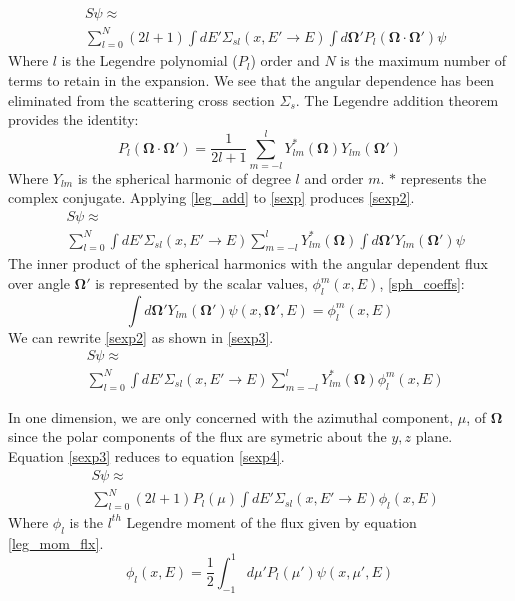 \begin{eqnarray}
& S\psi \approx \nonumber \\
& \sum_{l=0}^N (2l+1) \int dE' \Sigma_{sl}(x, E'\rightarrow E)
  \int d\mathbf\Omega' P_l(\mathbf\Omega \cdot \mathbf{\Omega'}) \psi
\label{sexp}
\end{eqnarray}
Where $l$ is the Legendre polynomial ($P_l$) order and $N$ is the maximum number of terms to retain in the expansion.  We see that the angular dependence has been eliminated from the scattering cross section $\Sigma_s$.
The Legendre addition theorem provides the identity:
\begin{equation}
P_l(\mathbf\Omega \cdot \mathbf{\Omega'}) = \frac{1}{2l+1}
\sum_{m=-l}^{l} Y^{*}_{lm}(\mathbf\Omega) Y_{lm}(\mathbf\Omega')
\label{leg_add}
\end{equation}
Where $Y_{lm}$ is the spherical harmonic of degree $l$ and order $m$.  $*$ represents the complex conjugate.  Applying \ref{leg_add} to \ref{sexp} produces \ref{sexp2}.
\begin{eqnarray}
& S\psi \approx \nonumber \\
& \sum_{l=0}^N \int dE' \Sigma_{sl}(x, E'\rightarrow E) \sum_{m=-l}^{l} Y^{*}_{lm}(\mathbf\Omega)
  \int d\mathbf\Omega' Y_{lm}(\mathbf\Omega') \psi
\label{sexp2}
\end{eqnarray}
The inner product of the spherical harmonics with the angular dependent flux over angle $\mathbf\Omega'$ is represented by the scalar values, $\phi_l^m(x, E)$, \ref{sph_coeffs}:
\begin{equation}
\int d\mathbf\Omega' Y_{lm}(\mathbf\Omega') \psi(x, \mathbf\Omega', E) = \phi_l^m(x, E)
\label{sph_coeffs}
\end{equation}
We can rewrite \ref{sexp2} as shown in \ref{sexp3}.
\begin{eqnarray}
& S\psi \approx \nonumber \\
& \sum_{l=0}^N \int dE' \Sigma_{sl}(x, E'\rightarrow E) \sum_{m=-l}^{l} Y^{*}_{lm}(\mathbf\Omega) \phi_l^m(x, E)
\label{sexp3}
\end{eqnarray}

In one dimension, we are only concerned with the azimuthal component, $\mu$, of $\mathbf\Omega$ since the polar components of the flux are symetric about the $y,z$ plane.  Equation \ref{sexp3} reduces to equation \ref{sexp4}.
\begin{eqnarray}
& S\psi \approx \nonumber \\
& \sum_{l=0}^N (2l+1) P_l(\mu) \int dE' \Sigma_{sl}(x, E'\rightarrow E) \phi_l(x, E)
\label{sexp4}
\end{eqnarray}
Where $\phi_l$ is the $l^{th}$ Legendre moment of the flux given by equation \ref{leg_mom_flx}.
\begin{equation}
\phi_l(x,E) = \frac{1}{2} \int_{-1}^1 d\mu' P_l(\mu') \psi(x, \mu', E)
\label{leg_mom_flx}
\end{equation}

